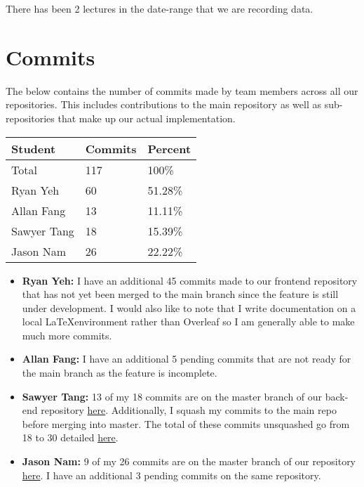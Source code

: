 \documentclass{article}
\begin{document}
There has been 2 lectures in the date-range that we are recording data.

\section{Commits}

The below contains the number of commits made by team members across all our repositories. This includes
contributions to the main repository as well as sub-repositories that make up our actual implementation.

\begin{table}[H]
\centering
\begin{tabular}{lll}
\toprule
\textbf{Student} & \textbf{Commits} & \textbf{Percent}\\
\midrule
Total & 117 & 100\% \\
Ryan Yeh & 60 & 51.28\% \\
Allan Fang & 13 & 11.11\% \\
Sawyer Tang & 18 & 15.39\% \\
Jason Nam & 26 & 22.22\% \\
\bottomrule
\end{tabular}
\end{table}

\begin{itemize}
  \item \textbf{Ryan Yeh:} I have an additional 45 commits made to our frontend repository that has not yet been
  merged to the main branch since the feature is still under development. I would also like to note that I write
  documentation on a local \LaTeX environment rather than Overleaf so I am generally able to make much more commits.
  \item \textbf{Allan Fang:} I have an additional 5 pending commits that are not ready for the main branch as the feature is incomplete.
  \item \textbf{Sawyer Tang:} 13 of my 18 commits are on the master branch of our back-end repository \href{https://github.com/Tanger71/grocery-spending-tracker-backend}{here}. Additionally, I squash my commits to the main repo before merging into master. The total of these commits unsquashed go from 18 to 30 detailed \href{https://github.com/r-yeh/grocery-spending-tracker/commits?author=Tanger71&since=2023-11-13&until=2024-01-28}{here}.
  \item \textbf{Jason Nam:} 9 of my 26 commits are on the master branch of our repository \href{https://github.com/jason-nam/grocery-web-scraper}{here}. I have an additional 3 pending commits on the same repository.
\end{itemize}
\end{document}

